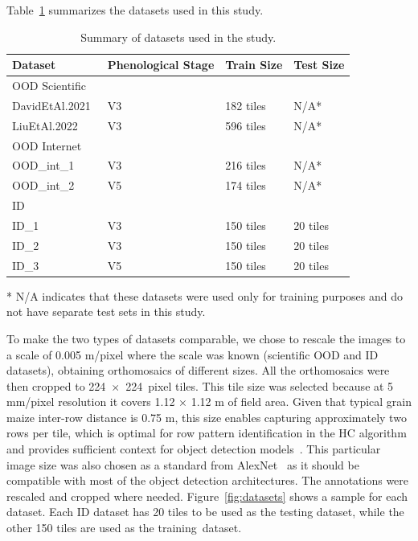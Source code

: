 \documentclass[12pt,a4paper,oneside]{report}
\begin{document}
Table~\ref{tab:datasets} summarizes the datasets used in this study.

\begin{table}[H]
\caption{Summary of datasets used in the study.}
\label{tab:datasets}
\begin{tabularx}{\textwidth}{llXX}
\toprule
\textbf{Dataset} & \textbf{Phenological Stage} & \textbf{Train Size} & \textbf{Test Size} \\
\midrule
\multicolumn{4}{l}{OOD Scientific} \\
\hspace{0.5em}DavidEtAl.2021~\cite{davidPlantDetectionCounting2021} & V3 & 182 tiles & N/A* \\
\hspace{0.5em}LiuEtAl.2022~\cite{liuEstimatingMaizeSeedling2022} & V3 & 596 tiles & N/A* \\
\midrule
\multicolumn{4}{l}{OOD Internet} \\
\hspace{0.5em}OOD\_int\_1~\cite{Maize_seedingDatasetOverview} & V3 & 216 tiles & N/A* \\
\hspace{0.5em}OOD\_int\_2~\cite{MaizeseedlingdetectionDatasetOverview} & V5 & 174 tiles & N/A* \\
\midrule
\multicolumn{4}{l}{ID~\cite{bumbaca202515235602}} \\
\hspace{0.5em}ID\_1 & V3 & 150 tiles & 20 tiles \\
\hspace{0.5em}ID\_2 & V3 & 150 tiles & 20 tiles \\
\hspace{0.5em}ID\_3 & V5 & 150 tiles & 20 tiles \\
\bottomrule
\end{tabularx}
\noindent\footnotesize{* N/A indicates that these datasets were used only for training purposes and do not have separate test sets in this study.}
\end{table}
\vspace{-6pt}


To make the two types of datasets comparable, we chose to rescale the images to a scale of 0.005 m/pixel
where the scale was known (scientific OOD and ID datasets), obtaining orthomosaics of different sizes.
All the orthomosaics were then cropped to \mbox{224 $\times$ 224 pixel} tiles.
This tile size was selected because at 5 mm/pixel resolution it covers 1.12 × 1.12 m of field area.
Given that typical grain maize inter-row distance is 0.75 m, this size enables capturing 
approximately two rows per tile, which is optimal for row pattern identification in the HC algorithm 
and provides sufficient context for object detection models~\cite{davidPlantDetectionCounting2021,liuEstimatingMaizeSeedling2022}.
This particular image size was also chosen as a standard from AlexNet~\cite{krizhevskyImageNetClassificationDeep2012}
as it should be compatible with most of the object detection architectures.
The annotations were rescaled and cropped where needed.
Figure~\ref{fig:datasets} shows a sample for each dataset.
Each ID dataset has 20 tiles to be used as the testing dataset, while the other 
150 tiles are used as the training~dataset.
\end{document}
